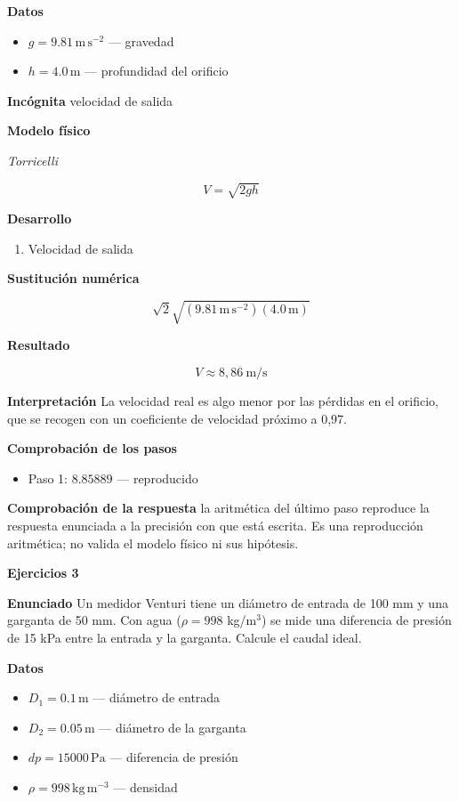 \documentclass[10pt,openany]{book}
\begin{document}
\noindent\textbf{Datos}
\begin{itemize}
\item $g = 9.81\,\mathrm{m}\,\mathrm{s}^{-2}$ — gravedad
\item $h = 4.0\,\mathrm{m}$ — profundidad del orificio
\end{itemize}

\noindent\textbf{Incógnita}
velocidad de salida

\noindent\textbf{Modelo físico}

\noindent\textit{Torricelli}

\[
V = \sqrt{2 g h}
\]

\noindent\textbf{Desarrollo}
\begin{enumerate}
\item
Velocidad de salida
\end{enumerate}

\noindent\textbf{Sustitución numérica}

\[
\sqrt{2} \sqrt{\left(9.81\,\mathrm{m}\,\mathrm{s}^{-2}\right) \left(4.0\,\mathrm{m}\right)}
\]

\noindent\textbf{Resultado}

\[
V \approx 8{,}86\ \mathrm{m/s}
\]

\noindent\textbf{Interpretación}
La velocidad real es algo menor por las pérdidas en el orificio, que se recogen con un coeficiente de velocidad próximo a 0,97.

\noindent\textbf{Comprobación de los pasos}
\begin{itemize}
\item Paso 1: $8.85889$ — reproducido
\end{itemize}

\noindent\textbf{Comprobación de la respuesta} la aritmética del último paso reproduce la respuesta enunciada a la precisión con que está escrita. Es una reproducción aritmética; no valida el modelo físico ni sus hipótesis.

\noindent\textbf{Ejercicios 3}

\noindent\textbf{Enunciado}
Un medidor Venturi tiene un diámetro de entrada de 100 mm y una garganta de 50 mm. Con agua (\(\rho = 998\) kg/m\(^3\)) se mide una diferencia de presión de 15 kPa entre la entrada y la garganta. Calcule el caudal ideal.

\noindent\textbf{Datos}
\begin{itemize}
\item $D_{1} = 0.1\,\mathrm{m}$ — diámetro de entrada
\item $D_{2} = 0.05\,\mathrm{m}$ — diámetro de la garganta
\item $dp = 15000\,\mathrm{Pa}$ — diferencia de presión
\item $\rho = 998\,\mathrm{kg}\,\mathrm{m}^{-3}$ — densidad
\end{itemize}
\end{document}
